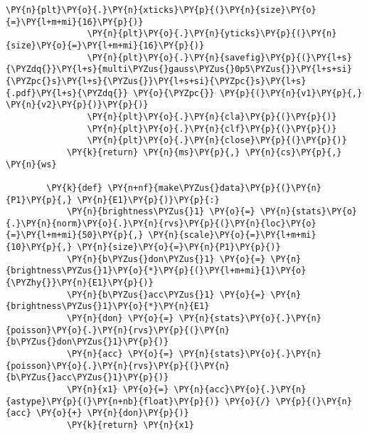 \begin{Verbatim}[commandchars=\\\{\}, fontsize=\scriptsize]
                \PY{n}{plt}\PY{o}{.}\PY{n}{xticks}\PY{p}{(}\PY{n}{size}\PY{o}{=}\PY{l+m+mi}{16}\PY{p}{)}
                \PY{n}{plt}\PY{o}{.}\PY{n}{yticks}\PY{p}{(}\PY{n}{size}\PY{o}{=}\PY{l+m+mi}{16}\PY{p}{)}
                \PY{n}{plt}\PY{o}{.}\PY{n}{savefig}\PY{p}{(}\PY{l+s}{\PYZdq{}}\PY{l+s}{multi\PYZus{}gauss\PYZus{}0p5\PYZus{}}\PY{l+s+si}{\PYZpc{}s}\PY{l+s}{\PYZus{}}\PY{l+s+si}{\PYZpc{}s}\PY{l+s}{.pdf}\PY{l+s}{\PYZdq{}} \PY{o}{\PYZpc{}} \PY{p}{(}\PY{n}{v1}\PY{p}{,} \PY{n}{v2}\PY{p}{)}\PY{p}{)}
                \PY{n}{plt}\PY{o}{.}\PY{n}{cla}\PY{p}{(}\PY{p}{)}
                \PY{n}{plt}\PY{o}{.}\PY{n}{clf}\PY{p}{(}\PY{p}{)}
                \PY{n}{plt}\PY{o}{.}\PY{n}{close}\PY{p}{(}\PY{p}{)}
            \PY{k}{return} \PY{n}{ms}\PY{p}{,} \PY{n}{cs}\PY{p}{,} \PY{n}{ws}
        
        \PY{k}{def} \PY{n+nf}{make\PYZus{}data}\PY{p}{(}\PY{n}{P1}\PY{p}{,} \PY{n}{E1}\PY{p}{)}\PY{p}{:}
            \PY{n}{brightness\PYZus{}1} \PY{o}{=} \PY{n}{stats}\PY{o}{.}\PY{n}{norm}\PY{o}{.}\PY{n}{rvs}\PY{p}{(}\PY{n}{loc}\PY{o}{=}\PY{l+m+mi}{50}\PY{p}{,} \PY{n}{scale}\PY{o}{=}\PY{l+m+mi}{10}\PY{p}{,} \PY{n}{size}\PY{o}{=}\PY{n}{P1}\PY{p}{)}
            \PY{n}{b\PYZus{}don\PYZus{}1} \PY{o}{=} \PY{n}{brightness\PYZus{}1}\PY{o}{*}\PY{p}{(}\PY{l+m+mi}{1}\PY{o}{\PYZhy{}}\PY{n}{E1}\PY{p}{)}
            \PY{n}{b\PYZus{}acc\PYZus{}1} \PY{o}{=} \PY{n}{brightness\PYZus{}1}\PY{o}{*}\PY{n}{E1}
            \PY{n}{don} \PY{o}{=} \PY{n}{stats}\PY{o}{.}\PY{n}{poisson}\PY{o}{.}\PY{n}{rvs}\PY{p}{(}\PY{n}{b\PYZus{}don\PYZus{}1}\PY{p}{)}
            \PY{n}{acc} \PY{o}{=} \PY{n}{stats}\PY{o}{.}\PY{n}{poisson}\PY{o}{.}\PY{n}{rvs}\PY{p}{(}\PY{n}{b\PYZus{}acc\PYZus{}1}\PY{p}{)}
            \PY{n}{x1} \PY{o}{=} \PY{n}{acc}\PY{o}{.}\PY{n}{astype}\PY{p}{(}\PY{n+nb}{float}\PY{p}{)} \PY{o}{/} \PY{p}{(}\PY{n}{acc} \PY{o}{+} \PY{n}{don}\PY{p}{)}
            \PY{k}{return} \PY{n}{x1}
        

\end{Verbatim}
